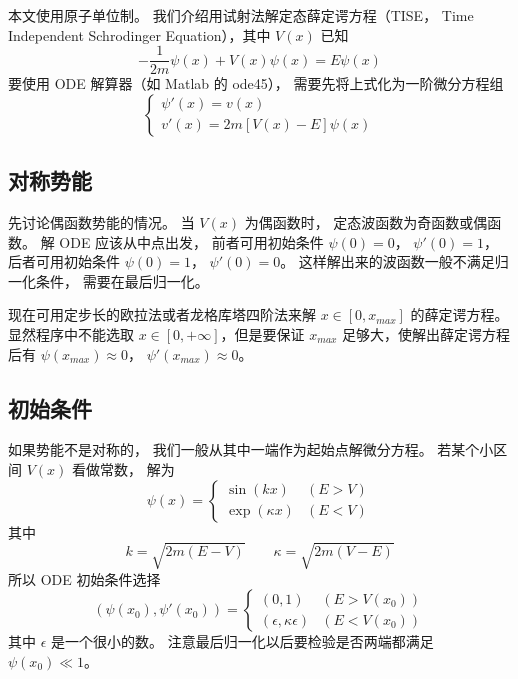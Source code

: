 


本文使用原子单位制。 我们介绍用试射法解定态薛定谔方程（TISE， Time Independent Schrodinger Equation），其中 $V(x)$ 已知
\begin{equation}
-\frac{1}{2m}\psi(x) + V(x)\psi(x) = E \psi(x)
\end{equation}
要使用 ODE 解算器（如 Matlab 的 ode45）， 需要先将上式化为一阶微分方程组
\begin{equation}
\begin{cases}
\psi'(x) = v(x)\\
v'(x) = 2m[V(x) - E]\psi(x)
\end{cases}
\end{equation}

\subsection{对称势能}
先讨论偶函数势能的情况。 当 $V(x)$ 为偶函数时， 定态波函数为奇函数或偶函数。 解 ODE 应该从中点出发， 前者可用初始条件 $\psi(0)=0$， $\psi'(0)=1$， 后者可用初始条件 $\psi(0)=1$， $\psi'(0)=0$。 这样解出来的波函数一般不满足归一化条件， 需要在最后归一化。

现在可用定步长的欧拉法或者龙格库塔四阶法来解 $x\in [0, x_{max}]$ 的薛定谔方程。 显然程序中不能选取 $x\in [0,+\infty]$，但是要保证 $x_{max}$ 足够大，使解出薛定谔方程后有 $\psi(x_{max})\approx 0$， $\psi'(x_{max})\approx 0$。

\subsection{初始条件}
如果势能不是对称的， 我们一般从其中一端作为起始点解微分方程。 若某个小区间 $V(x)$ 看做常数， 解为
\begin{equation}
\psi(x) =
\begin{cases}
\sin(kx) &(E > V)\\
\exp(\kappa x) & (E < V)
\end{cases}
\end{equation}
其中
\begin{equation}
k = \sqrt{2m(E - V)} \qquad
\kappa = \sqrt{2m(V - E)}
\end{equation}
所以 ODE  初始条件选择
\begin{equation}
(\psi(x_0), \psi'(x_0)) =
\begin{cases}
(0, 1) &(E > V(x_0))\\
(\epsilon, \kappa\epsilon) & (E < V(x_0))
\end{cases}
\end{equation}
其中 $\epsilon$ 是一个很小的数。 注意最后归一化以后要检验是否两端都满足 $\psi(x_0) \ll 1$。

